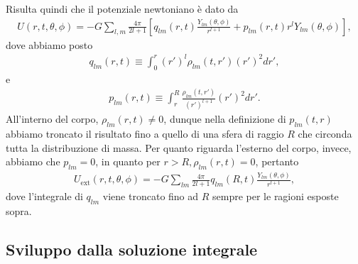 Risulta quindi che il potenziale newtoniano è dato da
\begin{align}
	U(r, t, \theta, \phi) = -G \sum_{l, m} \frac{4 \pi}{2l+1} \left[q_{lm}(r,t) \frac{Y_{lm}(\theta, \phi)}{r^{l+1}} + p_{lm}(r,t) r^l Y_{lm}(\theta, \phi) \right],
\end{align}
dove abbiamo posto
\begin{align}
	q_{lm}(r, t) \equiv \int_0^r (r')^l \rho_{lm}(t, r') (r')^2 dr',
\end{align}
e
\begin{align}
	p_{lm}(r, t) \equiv \int_r^R \frac{\rho_{lm}(t, r')}{(r')^{l+1}} (r')^2 dr'.
\end{align}
All'interno del corpo, $\rho_{lm}(r, t) \neq 0$, dunque nella definizione di $p_{lm}(t,r)$ abbiamo troncato il risultato fino a quello di una sfera di raggio $R$ che circonda tutta la distribuzione di massa. Per quanto riguarda l'esterno del corpo, invece, abbiamo che $p_{lm} = 0$, in quanto per $r > R, \rho_{lm}(r, t) = 0$, pertanto
\begin{align}
	U_{\text{ext}}(r, t, \theta, \phi) = -G \sum_{lm} \frac{4 \pi}{2l+1} q_{lm}(R, t) \frac{Y_{lm}(\theta, \phi)}{r^{l+1}},
\end{align}
dove l'integrale di $q_{lm}$ viene troncato fino ad $R$ sempre per le ragioni esposte sopra. \newline

\subsection{Sviluppo dalla soluzione integrale}

